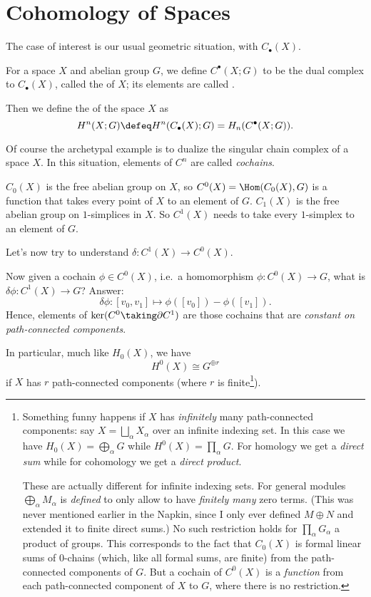 \section{Cohomology of Spaces}

The case of interest is our usual geometric situation, with $C_\bullet(X)$.
\begin{definition}
	For a space $X$ and abelian group $G$,
	we define $C^\bullet(X;G)$ to be the dual complex to $C_\bullet(X)$,
	called the  of $X$;
	its elements are called .

	Then we define the 
	of the space $X$ as 
	\[ H^n(X; G) \defeq H^n(C_\bullet(X); G) = H_n(C^\bullet(X;G)). \]
\end{definition}

\begin{example}
	[$C^0(X; G)$, $C^1(X; G)$, and $H^0(X;G)$]
	Of course the archetypal example is to dualize the singular chain complex
	of a space $X$. In this situation, elements of $C^n$ are called \emph{cochains}.
	\begin{itemize}
		\ii $C_0(X)$ is the free abelian group on $X$,
		so $C^0(X) = \Hom(C_0(X), G)$ is a function that
		takes every point of $X$ to an element of $G$.
		\ii $C_1(X)$ is the free abelian group on $1$-simplices in $X$.
		So $C^1(X)$ needs to take every $1$-simplex to an element of $G$.
	\end{itemize}
	Let's now try to understand $\delta : C^1(X) \to C^0(X)$.

	Now given a cochain $\phi \in C^0(X)$, i.e.\ a homomorphism $\phi : C^0(X) \to G$,
	what is $\delta\phi : C^1(X) \to G$?
	Answer: 
	\[ \delta\phi : [v_0, v_1] \mapsto \phi([v_0]) - \phi([v_1]). \]
	Hence, elements of $\ker(C^0 \taking\partial C^1)$ are those cochains
	that are \emph{constant on path-connected components}.
\end{example}
In particular, much like $H_0(X)$, we have \[ H^0(X) \cong G^{\oplus r} \]
if $X$ has $r$ path-connected components (where $r$ is finite\footnote{%
	Something funny happens if $X$ has \emph{infinitely} many path-connected components:
	say $X = \bigsqcup_\alpha X_\alpha$ over an infinite indexing set.
	In this case we have
	$H_0(X) = \bigoplus_\alpha G$ while $H^0(X) = \prod_\alpha G$.
	For homology we get a \emph{direct sum} while
	for cohomology we get a \emph{direct product}.

	These are actually different for infinite indexing sets.
	For general modules $\bigoplus_\alpha M_\alpha$ is \emph{defined} to only allow
	to have \emph{finitely many} zero terms.
	(This was never mentioned earlier in the Napkin,
	since I only ever defined $M \oplus N$ and extended it to finite direct sums.)
	No such restriction holds for $\prod_\alpha G_\alpha$ a product of groups.
	This corresponds to the fact that $C_0(X)$ is formal linear sums of $0$-chains
	(which, like all formal sums, are finite)
	from the path-connected components of $G$.
	But a cochain of $C^0(X)$ is a \emph{function}
	from each path-connected component of $X$ to $G$,
	where there is no restriction.
}).

